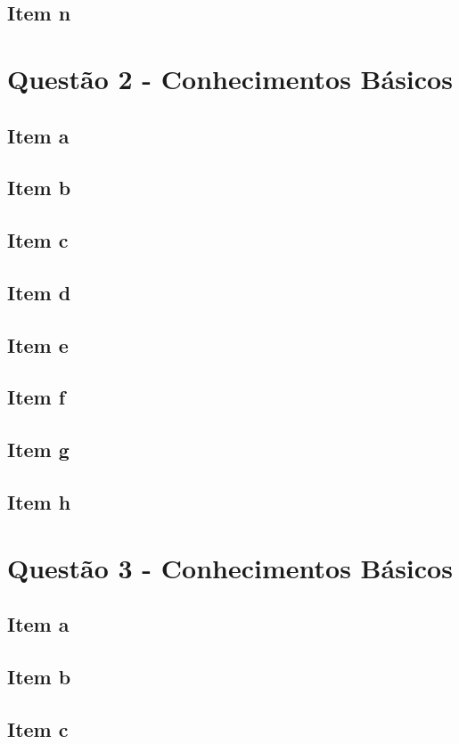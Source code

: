 \documentclass[a4paper, 12pt]{article}
\begin{document}
		\subsection{Item n}		
	\section{Quest\~{a}o 2 - Conhecimentos Básicos}
		\subsection{Item a}	
		\subsection{Item b}	
		\subsection{Item c}	
		\subsection{Item d}	
		\subsection{Item e}	
		\subsection{Item f}	
		\subsection{Item g}	
		\subsection{Item h}	
	\section{Quest\~{a}o 3 - Conhecimentos Básicos}
		\subsection{Item a}	
		\subsection{Item b}	
		\subsection{Item c}	
\end{document}
